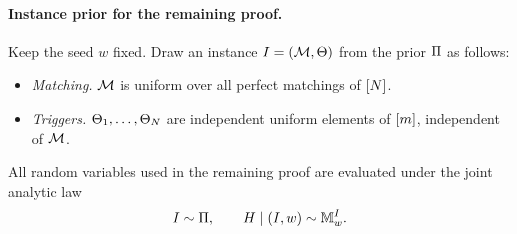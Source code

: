 \paragraph{Instance prior for the remaining proof.}
Keep the seed \(w\) fixed. Draw an instance
\(I=(\HiddenMatching,\TriggerVector)\) from the prior
\(\HardInstancePrior\) as follows:
\begin{itemize}
\item \emph{Matching.} \(\HiddenMatching\) is uniform over all perfect
matchings of \(\PositionSet\).
\item \emph{Triggers.} \(\TriggerIndex{1},\ldots,\TriggerIndex{N}\) are
independent uniform elements of \([\HardBankSize]\), independent of
\(\HiddenMatching\).
\end{itemize}
All random variables used in the remaining proof are evaluated under the
joint analytic law
\begin{equation}
 I\sim\HardInstancePrior,
 \qquad
 H\mid(I,w)\sim\HardMidpointLaw{I}{w}.
 \label{app:eq:joint-instance-midpoint-law}
\end{equation}
